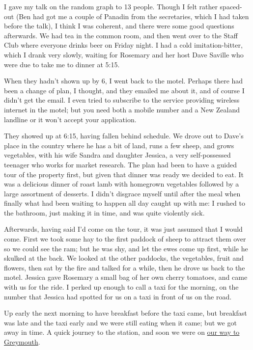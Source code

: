 \documentclass[12pt,a4paper]{article}
\begin{document}
I gave my talk on the random graph to 13 people. Though I felt rather
spaced-out (Ben had got me a couple of Panadin from the secretaries, which
I had taken before the talk), I think I was coherent, and there were some 
good questions afterwards. We had tea in the common room, and then went over
to the Staff Club where everyone drinks beer on Friday night. I had a cold
imitation-bitter, which I drank very slowly, waiting for Rosemary and her
host Dave Saville who were due to take me to dinner at 5:15.

When they hadn't shown up by 6, I went back to the motel. Perhaps there had
been a change of plan, I thought, and they emailed me about it, and of 
course I didn't get the email. I even tried to subscribe to the service
providing wireless internet in the motel; but you need both a mobile number
and a New Zealand landline or it won't accept your application.

They showed up at 6:15, having fallen behind schedule. We drove out to
Dave's place in the country where he has a bit of land, runs a few sheep,
and grows vegetables, with his wife Sandra and daughter Jessica, a very
self-possessed teenager who works for market research. The plan had been
to have a guided tour of the property first, but given that dinner was ready
we decided to eat. It was a delicious dinner of roast lamb with homegrown
vegetables followed by a large assortment of desserts. I didn't disgrace
myself until after the meal when finally what had been waiting to happen
all day caught up with me: I rushed to the bathroom, just making it in
time, and was quite violently sick.

Afterwards, having said I'd come on the tour, it was just assumed that I
would come. First we took some hay to the first paddock of sheep to
attract them over so we could see the ram; but he was shy, and let the
ewes come up first, while he skulked at the back. We looked at the other
paddocks, the vegetables, fruit and flowers, then sat by the fire and talked
for a while, then he drove us back to the motel. Jessica gave Rosemary a
small bag of her own cherry tomatoes, and came with us for the ride. I 
perked up enough to call a taxi for the morning, on the number that Jessica
had spotted for us on a taxi in front of us on the road.

Up early the next morning to have breakfast before the taxi came, but 
breakfast was late and the taxi early and we were still eating when it came;
but we got away in time. A quick journey to the station, and soon we were on
\href{http://www.tranzscenic.co.nz/services/tranzalpine.aspx}{our way to 
Greymouth}.
\end{document}
